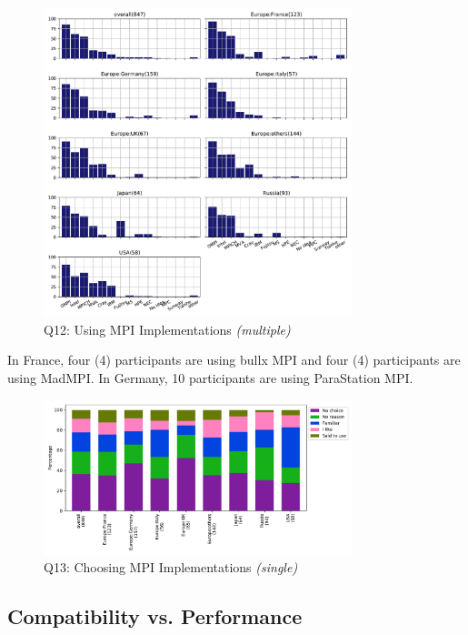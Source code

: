 \documentclass[conference,10pt,letterpaper]{IEEEtran}
\begin{document}
\begin{figure}[htb]
\begin{center}
\includegraphics[width=9cm]{Figs/Q12.pdf}
\caption{Q12: Using MPI Implementations {\it(multiple)}}
\label{fig:using-implementations}
\end{center}
\end{figure}

In France, four (4) participants are using bullx MPI and four (4)
participants are using MadMPI. In Germany, 10 participants are using
ParaStation MPI.

\begin{figure}[htb]
\begin{center}
\includegraphics[width=9cm]{Figs/Q13.pdf}
\caption{Q13: Choosing MPI Implementations {\it(single)}}
\label{fig:choosing-implementation}
\end{center}
\end{figure}

\subsection{Compatibility vs. Performance}
\end{document}
